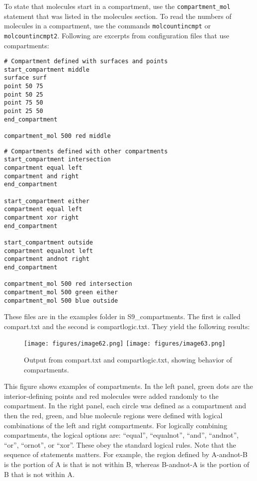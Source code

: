 \documentclass {scrbook}
\newcommand {\ttt} {\texttt}
\begin{document}
To state that molecules start in a compartment, use the \ttt{compartment\_mol} statement that was listed in the molecules section. To read the numbers of molecules in a compartment, use the commands \ttt{molcountincmpt} or \ttt{molcountincmpt2}.
Following are excerpts from configuration files that use compartments:

\begin{lstlisting}[style=SSAC]
# Compartment defined with surfaces and points
start_compartment middle
surface surf
point 50 75
point 50 25
point 75 50
point 25 50
end_compartment

compartment_mol 500 red middle
\end{lstlisting}

\begin{lstlisting}[style=SSAC]
# Compartments defined with other compartments
start_compartment intersection
compartment equal left
compartment and right
end_compartment

start_compartment either
compartment equal left
compartment xor right
end_compartment

start_compartment outside
compartment equalnot left
compartment andnot right
end_compartment

compartment_mol 500 red intersection
compartment_mol 500 green either
compartment_mol 500 blue outside
\end{lstlisting}

These files are in the examples folder in S9\_compartments. The first is called compart.txt and the second is compartlogic.txt. They yield the following results:

\begin{figure}[h]
\centering
\texttt{[image: figures/image62.png]}
\texttt{[image: figures/image63.png]}
\caption{Output from compart.txt and compartlogic.txt, showing behavior of compartments.}
\label{fig:compart}
\end{figure}

This figure shows examples of compartments. In the left panel, green dots are the interior-defining points and red molecules were added randomly to the compartment. In the right panel, each circle was defined as a compartment and then the red, green, and blue molecule regions were defined with logical combinations of the left and right compartments.
For logically combining compartments, the logical options are: ``equal'', ``equalnot'', ``and'', ``andnot'', ``or'', ``ornot'', or ``xor''. These obey the standard logical rules. Note that the sequence of statements matters. For example, the region defined by A-andnot-B is the portion of A is that is not within B, whereas B-andnot-A is the portion of B that is not within A.
\end{document}
